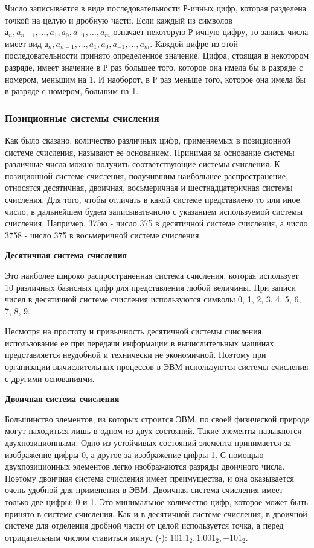 Число записывается в виде последовательности Р-ичных цифр, которая разделена точкой на целую и дробную части. Если каждый из символов $а_{n}, a_{n-1},\dots,a_{1}, a_{0}, a_{-1}, \dots,a_{m}$ означает некоторую Р-ичную цифру, то запись числа имеет вид $а_{n}, a_{n-1},\dots,a_{1}, a_{0},a_{-1}, \dots,a_{m}$. Каждой цифре из этой последовательности принято определенное значение. Цифра, стоящая в некотором разряде, имеет значение в Р раз большее того, которое она имела бы в разряде с номером, меньшим на
1. И наоборот, в Р раз меньше того, которое она имела бы в разряде с номером, большим на 1.

\subsubsection{Позиционные системы счисления}

Как было сказано, количество различных цифр, применяемых в позиционной системе счисления, называют ее основанием. Принимая за основание системы различные числа можно получить соответствующие системы счисления. К позиционной системе счисления, получившим наибольшее распространение, относятся десятичная, двоичная, восьмеричная и шестнадцатеричная системы счисления. Для того, чтобы отличать в какой системе представлено то или иное число, в дальнейшем будем записыватьчисло с указанием используемой системы счисления. Например, 375ю - число 375 в десятичной системе счисления, а число 3758 - число 375 в восьмеричной системе счисления.

\textbf{Десятичная система счисления}

Это наиболее широко распространенная система счисления, которая использует 10 различных базисных цифр для представления любой величины. При записи чисел в десятичной системе счисления используются символы 0, 1, 2, 3, 4, 5, 6, 7, 8, 9.

Несмотря на простоту и привычность десятичной системы счисления, использование ее при передачи информации в вычислительных машинах представляется неудобной и технически не экономичной. Поэтому при организации вычислительных процессов в ЭВМ используются системы счисления с другими основаниями.

\textbf{Двоичная система счисления}

Большинство элементов, из которых строится ЭВМ, по своей физической природе могут находиться лишь в одном из двух состояний. Такие элементы называются двухпозиционными. Одно из устойчивых состояний элемента принимается за изображение цифры 0, а другое за изображение цифры 1. С помощью двухпозиционных элементов легко изображаются разряды двоичного числа. Поэтому двоичная система счисления имеет преимущества, и она оказывается очень удобной для применения в ЭВМ. Двоичная система счисления имеет только две цифры: 0 и 1. Это минимальное количество цифр, которое может быть принято в системе счисления. Как и в десятичной системе счисления, в двоичной системе для отделения дробной части от целой используется точка, а перед отрицательным числом ставиться минус (-): $101.1_{2}, 1.001_{2}, -101_{2}$.

